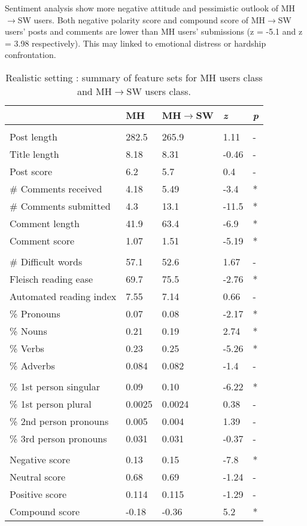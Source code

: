 Sentiment analysis show more negative attitude and pessimistic outlook of MH$\rightarrow$SW users. Both negative polarity score and compound score of MH$\rightarrow$SW users' posts and comments are lower than MH users' submissions (z = -5.1 and z = 3.98 respectively). This may linked to emotional distress or hardship confrontation.\\
\begin{table}
\noindent\begin{tabularx}{\textwidth}{>{\hsize=0.4\textwidth}XXXXX}
\toprule
& MH  & MH$\rightarrow$SW & \textit{z} & \textit{p}\\
\midrule
\rowcolor{gray}
\multicolumn{5}{c}{Interaction} \\ 
Post length  & 282.5  & 265.9  & 1.11 & -\\
Title length  & 8.18  &  8.31  &  -0.46 & -\\
Post score  & 6.2 & 5.7   & 0.4 &  -\\
\# Comments received  & 4.18 & 5.49 & -3.4 & *\\
\# Comments submitted & 4.3 & 13.1 & -11.5 & *\\
Comment length & 41.9 & 63.4 & -6.9 &  * \\
Comment score & 1.07 & 1.51 & -5.19 & *\\
\rowcolor{gray}
\multicolumn{5}{c}{Linguistic structure} \\ 
\# Difficult words & 57.1 & 52.6 & 1.67 & -\\
Fleisch reading ease & 69.7 & 75.5 & -2.76 & *\\
Automated reading index & 7.55 & 7.14 & 0.66  & -\\
\% Pronouns  & 0.07 & 0.08 & -2.17  & *\\
\% Nouns & 0.21& 0.19 & 2.74  &  *\\
\% Verbs & 0.23 & 0.25 & -5.26  &  *\\
\% Adverbs & 0.084 & 0.082 & -1.4  &  -\\
\rowcolor{gray}
\multicolumn{5}{c}{Interpersonal awareness} \\ 
\% 1st person singular & 0.09 & 0.10 & -6.22 & *\\
\% 1st person plural & 0.0025 & 0.0024 & 0.38 & -\\
\% 2nd person pronouns & 0.005 & 0.004 & 1.39 &-\\
\% 3rd person pronouns & 0.031 & 0.031 & -0.37 & -\\
\rowcolor{gray}
\multicolumn{5}{c}{Sentiment analysis} \\
Negative score & 0.13 & 0.15 & -7.8 & *\\
Neutral score  & 0.68 & 0.69  & -1.24 & -\\
Positive score & 0.114 & 0.115 & -1.29 &-\\
Compound score & -0.18 & -0.36 & 5.2 & *\\
\bottomrule
\end{tabularx}
\caption{Realistic setting : summary of feature sets for MH users class and  MH$\rightarrow$SW users class.}
\label{tab:z_realisitc}
\end{table}
